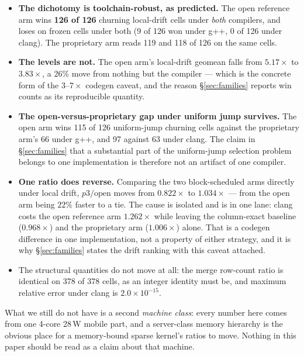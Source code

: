\documentclass{article}
\begin{document}
\begin{itemize}\itemsep2pt
  \item \textbf{The dichotomy is toolchain-robust, as predicted.} The open
    reference arm wins \textbf{126 of 126} churning local-drift cells under
    \emph{both} compilers, and loses on frozen cells under both (9 of 126 won
    under g++, 0 of 126 under clang). The proprietary arm reads 119 and 118 of
    126 on the same cells.
  \item \textbf{The levels are not.} The open arm's local-drift geomean falls
    from $5.17\times$ to $3.83\times$, a $26\%$ move from nothing but the
    compiler --- which is the concrete form of the $3$--$7\times$ codegen
    caveat, and the reason \S\ref{sec:families} reports win counts as its
    reproducible quantity.
  \item \textbf{The open-versus-proprietary gap under uniform jump survives.}
    The open arm wins 115 of 126 uniform-jump churning cells against the
    proprietary arm's 66 under g++, and 97 against 63 under clang. The claim in
    \S\ref{sec:families} that a substantial part of the uniform-jump selection
    problem belongs to one implementation is therefore not an artifact of one
    compiler.
  \item \textbf{One ratio does reverse.} Comparing the two block-scheduled arms
    directly under local drift, $p3/\text{open}$ moves from $0.822\times$ to
    $1.034\times$ --- from the open arm being $22\%$ faster to a tie. The cause
    is isolated and is in one lane: clang costs the open reference arm
    $1.262\times$ while leaving the column-exact baseline ($0.968\times$) and
    the proprietary arm ($1.006\times$) alone. That is a codegen difference in
    one implementation, not a property of either strategy, and it is why
    \S\ref{sec:families} states the drift ranking with this caveat attached.
  \item The structural quantities do not move at all: the merge row-count ratio
    is identical on 378 of 378 cells, as an integer identity must be, and
    maximum relative error under clang is $2.0\times10^{-15}$.
\end{itemize}

What we still do not have is a second \emph{machine class}: every number here
comes from one 4-core 28\,W mobile part, and a server-class memory hierarchy is
the obvious place for a memory-bound sparse kernel's ratios to move. Nothing in
this paper should be read as a claim about that machine.
\end{document}
